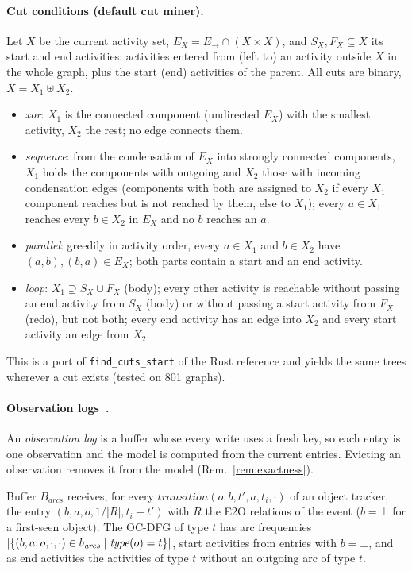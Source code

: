 \paragraph{Cut conditions (default cut miner).}
Let $X$ be the current activity set, $E_X = E_\to \cap (X \times X)$, and
$S_X, F_X \subseteq X$ its start and end activities: activities entered from
(left to) an activity outside $X$ in the whole graph, plus the start (end)
activities of the parent. All cuts are binary, $X = X_1 \uplus X_2$.
\begin{itemize}
  \item \emph{xor}: $X_1$ is the connected component (undirected $E_X$) with
        the smallest activity, $X_2$ the rest; no edge connects them.
  \item \emph{sequence}: from the condensation of $E_X$ into strongly
        connected components, $X_1$ holds the components with outgoing and
        $X_2$ those with incoming condensation edges (components with both are
        assigned to $X_2$ if every $X_1$ component reaches but is not reached
        by them, else to $X_1$); every $a \in X_1$ reaches every $b \in X_2$ in
        $E_X$ and no $b$ reaches an $a$.
  \item \emph{parallel}: greedily in activity order, every $a \in X_1$ and
        $b \in X_2$ have $(a,b), (b,a) \in E_X$; both parts contain a start and
        an end activity.
  \item \emph{loop}: $X_1 \supseteq S_X \cup F_X$ (body); every other
        activity is reachable without passing an end activity from $S_X$
        (body) or without passing a start activity from $F_X$ (redo), but not
        both; every end activity has an edge into $X_2$ and every start
        activity an edge from $X_2$.
\end{itemize}
This is a port of \texttt{find\_cuts\_start} of the Rust reference and yields
the same trees wherever a cut exists (tested on 801 graphs).

\paragraph{Observation logs~\cite{Liss2025}.}
An \emph{observation log} is a buffer whose every write uses a fresh key, so
each entry is one observation and the model is computed from the current
entries. Evicting an observation removes it from the model
(Rem.~\ref{rem:exactness}).

\begin{definition}\label{def:arclog}
Buffer $B_{\mathit{arcs}}$ receives, for every
$\mathit{transition}(o, b, t', a, t_i, \cdot)$ of an object tracker, the entry
$(b, a, o, 1/|R|, t_i - t')$ with $R$ the E2O relations of the event ($b = \bot$
for a first-seen object). The OC-DFG of type $t$ has arc frequencies
$|\{(b,a,o,\cdot,\cdot) \in b_{\mathit{arcs}} \mid \mathit{type}(o) = t\}|$, start
activities from entries with $b = \bot$, and as end activities the activities
of type $t$ without an outgoing arc of type $t$.
\end{definition}

